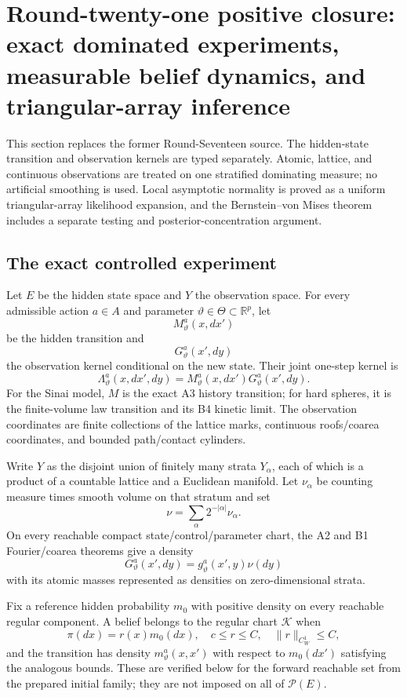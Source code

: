 \section{Round-twenty-one positive closure: exact dominated experiments, measurable belief dynamics, and triangular-array inference}
\label{sec:r21-c1}

This section replaces the former Round-Seventeen source.  The hidden-state
transition and observation kernels are typed separately.  Atomic, lattice,
and continuous observations are treated on one stratified dominating measure;
no artificial smoothing is used.  Local asymptotic normality is proved as a
uniform triangular-array likelihood expansion, and the Bernstein--von Mises
theorem includes a separate testing and posterior-concentration argument.

\subsection{The exact controlled experiment}

Let $E$ be the hidden state space and $Y$ the observation space.  For every
admissible action $a\in A$ and parameter $\vartheta\in\Theta\subset\mathbb R^p$,
let
\[
 M_{\vartheta}^{a}(x,dx')
\]
be the hidden transition and
\[
 G_{\vartheta}^{a}(x',dy)
\]
the observation kernel conditional on the new state.  Their joint one-step
kernel is
\[
 \Lambda_{\vartheta}^{a}(x,dx',dy)
 =M_{\vartheta}^{a}(x,dx')G_{\vartheta}^{a}(x',dy).
\]
For the Sinai model, $M$ is the exact A3 history transition; for hard spheres,
it is the finite-volume law transition and its B4 kinetic limit.  The
observation coordinates are finite collections of the lattice marks,
continuous roofs/coarea coordinates, and bounded path/contact cylinders.

Write $Y$ as the disjoint union of finitely many strata $Y_\alpha$, each of
which is a product of a countable lattice and a Euclidean manifold.  Let
$\nu_\alpha$ be counting measure times smooth volume on that stratum and set
\[
 \nu=\sum_\alpha2^{-|\alpha|}\nu_\alpha.
\]
On every reachable compact state/control/parameter chart, the A2 and B1
Fourier/coarea theorems give a density
\[
 G_{\vartheta}^{a}(x',dy)=g_{\vartheta}^{a}(x',y)\nu(dy)
\]
with its atomic masses represented as densities on zero-dimensional strata.

Fix a reference hidden probability $m_0$ with positive density on every
reachable regular component.  A belief belongs to the regular chart
$\mathcal K$ when
\[
 \pi(dx)=r(x)m_0(dx),
 \quad c\le r\le C,
 \quad \|r\|_{C_W^1}\le C,
\]
and the transition has density
$m_\vartheta^a(x,x')$ with respect to $m_0(dx')$ satisfying the analogous
bounds.  These are verified below for the forward reachable set from the
prepared initial family; they are not imposed on all of
$\mathcal P(E)$.

